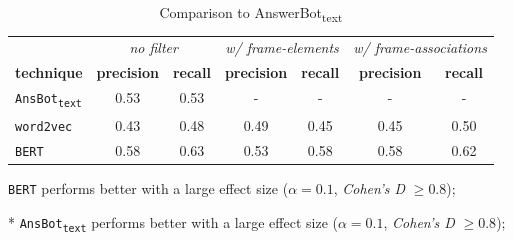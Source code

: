 \begin{table}
\caption{Comparison to AnswerBot\textsubscript{text}}
\label{tbl:techniques-results-answerbot-text}
\centering    
\begin{small}
\begin{threeparttable}
\begin{tabular}{lcccccc}


& \multicolumn{2}{c}{\textit{no filter}} 
& \multicolumn{2}{c}{\textit{w/ frame-elements}}
& \multicolumn{2}{c}{\textit{w/ frame-associations}}

\\ \cmidrule(l){2-3} \cmidrule(l){4-5} \cmidrule(l){6-7} 


\textbf{technique} & 
\textbf{precision} & \textbf{recall} &
\textbf{precision} & \textbf{recall} &
\textbf{precision} & \textbf{recall} \\ 



\cmidrule(l){1-7}

\texttt{AnsBot\textsubscript{text}} &
0.53 & 0.53 &
- & - &
- & -
\\


\texttt{word2vec} &
0.43\tnote{*} & 0.48\tnote{*} &
0.49\tnote{*} & 0.45\tnote{*} &
0.45\tnote{*} &  0.50\tnote{*} 
\\


\texttt{BERT} &
0.58\tnote{\textdagger} & 0.63\tnote{\textdagger} &
0.53 & 0.58\tnote{\textdagger} &
0.58\tnote{\textdagger} & 0.62\tnote{\textdagger} 
\\


\hline

\end{tabular}
\begin{tablenotes}
    \item[\textdagger] \texttt{BERT} performs better with a large effect size ($\alpha = 0.1$, \textit{Cohen's D} $\ge 0.8$);
    \item[*] \texttt{AnsBot\textsubscript{text}} performs better with a large effect size ($\alpha = 0.1$, \textit{Cohen's D} $\ge 0.8$);
\end{tablenotes}
\end{threeparttable}
\end{small}
\end{table}

